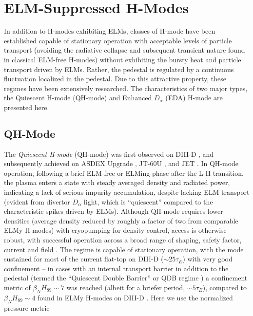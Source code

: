 \section{ELM-Suppressed H-Modes}\label{sec:hcr_elmsuppressed}

In addition to H-modes exhibiting ELMs, classes of H-mode have been established capable of stationary operation with acceptable levels of particle transport (avoiding the radiative collapse and subsequent transient nature found in classical ELM-free H-modes) without exhibiting the bursty heat and particle transport driven by ELMs.  Rather, the pedestal is regulated by a continuous fluctuation localized in the pedestal.  Due to this attractive property, these regimes have been extensively researched.  The characteristics of two major types, the Quiescent H-mode (QH-mode) and Enhanced $D_\alpha$ (EDA) H-mode are presented here.

\subsection{QH-Mode}\label{subsec:hcr_qh}

The \emph{Quiescent H-mode} (QH-mode) was first observed on DIII-D \cite{Burrell2002,Groebner2001}, and subsequently achieved on ASDEX Upgrade \cite{Suttrop2003a}, JT-60U \cite{Sakamoto2004}, and JET \cite{Suttrop2005}.  In QH-mode operation, following a brief ELM-free or ELMing phase after the L-H transition, the plasma enters a state with steady averaged density and radiated power, indicating a lack of serious impurity accumulation, despite lacking ELM transport (evident from divertor $D_\alpha$ light, which is ``quiescent'' compared to the characteristic spikes driven by ELMs).  Although QH-mode requires lower densities (average density reduced by roughly a factor of two from comparable ELMy H-modes) with cryopumping for density control, access is otherwise robust, with successful operation across a broad range of shaping, safety factor, current and field \cite{Burrell2002}.  The regime is capable of stationary operation, with the mode sustained for most of the current flat-top on DIII-D ($\sim 25 \tau_E$) with very good confinement -- in cases with an internal transport barrier in addition to the pedestal (termed the ``Quiescent Double Barrier'' or QDB regime \cite{Burrell2001,Doyle2001,Greenfield2002}) a confinement metric of $\beta_N H_{89} \sim 7$ was reached (albeit for a briefer period, $\sim 5 \tau_E$), compared to $\beta_N H_{89} \sim 4$ found in ELMy H-modes on DIII-D \cite{Doyle2001}.  Here we use the normalized pressure metric \cite{Troyon1984}

